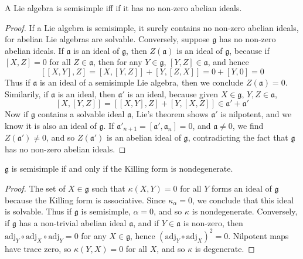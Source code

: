\begin{lemma}
    A Lie algebra is semisimple iff if it has no non-zero abelian ideals.
\end{lemma}
\begin{proof}
    If a Lie algebra is semisimple, it surely contains no non-zero abelian ideals, for abelian Lie algebras are solvable. Conversely, suppose $\mathfrak{g}$ has no non-zero abelian ideals. If $\mathfrak{a}$ is an ideal of $\mathfrak{g}$, then $Z(\mathfrak{a})$ is an ideal of $\mathfrak{g}$, because if $[X,Z] = 0$ for all $Z \in \mathfrak{a}$, then for any $Y \in \mathfrak{g}$, $[Y,Z] \in \mathfrak{a}$, and hence
    \[ [[X,Y],Z] = [X,[Y,Z]] + [Y,[Z,X]] = 0 + [Y,0] = 0 \]
    Thus if $\mathfrak{a}$ is an ideal of a semisimple Lie algebra, then we conclude $Z(\mathfrak{a}) = 0$. Similarily, if $\mathfrak{a}$ is an ideal, then $\mathfrak{a}'$ is an ideal, because given $X \in \mathfrak{g}$, $Y,Z \in \mathfrak{a}$,
    \[ [X,[Y,Z]] = [[X,Y],Z] + [Y,[X,Z]] \in \mathfrak{a}' + \mathfrak{a}' \]
    Now if $\mathfrak{g}$ contains a solvable ideal $\mathfrak{a}$, Lie's theorem shows $\mathfrak{a}'$ is nilpotent, and we know it is also an ideal of $\mathfrak{g}$. If $\mathfrak{a}'_{n+1} = [\mathfrak{a}', \mathfrak{a}_n] = 0$, and $\mathfrak{a} \neq 0$, we find $Z(\mathfrak{a}') \neq 0$, and so $Z(\mathfrak{a}')$ is an abelian ideal of $\mathfrak{g}$, contradicting the fact that $\mathfrak{g}$ has no non-zero abelian ideals.
\end{proof}

\begin{theorem}
    $\mathfrak{g}$ is semisimple if and only if the Killing form is nondegenerate.
\end{theorem}
\begin{proof}
    The set of $X \in \mathfrak{g}$ such that $\kappa(X,Y) = 0$ for all $Y$ forms an ideal of $\mathfrak{g}$ because the Killing form is associative. Since $\kappa_\alpha = 0$, we conclude that this ideal is solvable. Thus if $\mathfrak{g}$ is semisimple, $\alpha = 0$, and so $\kappa$ is nondegenerate. Conversely, if $\mathfrak{g}$ has a non-trivial abelian ideal $\mathfrak{a}$, and if $Y \in \mathfrak{a}$ is non-zero, then $\text{adj}_Y \circ \text{adj}_X \circ \text{adj}_Y = 0$ for any $X \in \mathfrak{g}$, hence $(\text{adj}_Y \circ \text{adj}_X)^2 = 0$. Nilpotent maps have trace zero, so $\kappa(Y,X) = 0$ for all $X$, and so $\kappa$ is degenerate.
\end{proof}

